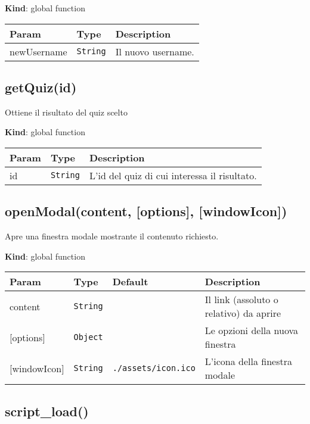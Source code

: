 \textbf{Kind}: global function

\begin{tabularx}{\textwidth}{XXX}
\toprule
Param & Type & Description\tabularnewline
\midrule
\endhead
newUsername & \texttt{String} & Il nuovo username.\tabularnewline
\bottomrule
\end{tabularx}

\protect\hypertarget{getQuiz}{}{}

\hypertarget{getquizid}{%
\subsection{getQuiz(id)}\label{getquizid}}

Ottiene il risultato del quiz scelto

\textbf{Kind}: global function

\begin{tabularx}{\textwidth}{XXX}
\toprule
Param & Type & Description\tabularnewline
\midrule
\endhead
id & \texttt{String} & L'id del quiz di cui interessa il
risultato.\tabularnewline
\bottomrule
\end{tabularx}

\protect\hypertarget{openModal}{}{}

\hypertarget{openmodalcontent-options-windowicon}{%
\subsection{openModal(content, {[}options{]},
{[}windowIcon{]})}\label{openmodalcontent-options-windowicon}}

Apre una finestra modale mostrante il contenuto richiesto.

\textbf{Kind}: global function

\begin{tabularx}{\textwidth}{XXXX}
\toprule
Param & Type & Default & Description\tabularnewline
\midrule
\endhead
content & \texttt{String} & & Il link (assoluto o relativo) da
aprire\tabularnewline
{[}options{]} & \texttt{Object} & & Le opzioni della nuova
finestra\tabularnewline
{[}windowIcon{]} & \texttt{String} & \texttt{./assets/icon.ico} &
L'icona della finestra modale\tabularnewline
\bottomrule
\end{tabularx}

\protect\hypertarget{script_load}{}{}

\hypertarget{script_load}{%
\subsection{script\_load()}\label{script_load}}

